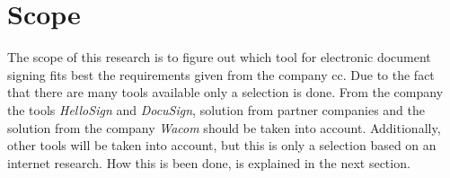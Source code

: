 \section{Scope}
The scope of this research is to figure out which tool for electronic document signing fits best the requirements given from the company \gls{cc}. Due to the fact that there are many tools available only a selection is done. From the company the tools \textit{HelloSign} and \textit{DocuSign}, solution from partner companies and the solution from the company \textit{Wacom} should be taken into account. Additionally, other tools will be taken into account, but this is only a selection based on an internet research. How this is been done, is explained in the next section.


